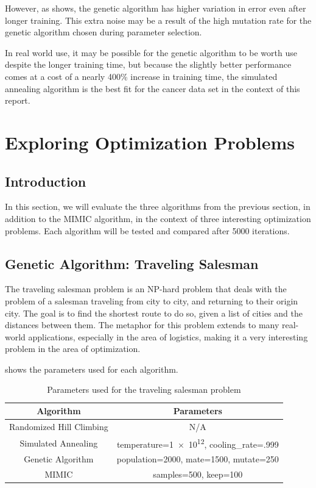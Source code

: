 \documentclass{article}
\begin{document}
      However, as  shows, the genetic algorithm has higher variation in error even after longer training. This extra noise may be a result of the high mutation rate for the genetic algorithm chosen during parameter selection.

      In real world use, it may be possible for the genetic algorithm to be worth use despite the longer training time, but because the slightly better performance comes at a cost of a nearly 400\% increase in training time, the simulated annealing algorithm is the best fit for the cancer data set in the context of this report.

  \section{Exploring Optimization Problems}

    \subsection{Introduction}
      In this section, we will evaluate the three algorithms from the previous section, in addition to the MIMIC algorithm, in the context of three interesting optimization problems. Each algorithm will be tested and compared after 5000 iterations.

    \subsection{Genetic Algorithm: Traveling Salesman}
      The traveling salesman problem is an NP-hard problem that deals with the problem of a salesman traveling from city to city, and returning to their origin city. The goal is to find the shortest route to do so, given a list of cities and the distances between them. The metaphor for this problem extends to many real-world applications, especially in the area of logistics, making it a very interesting problem in the area of optimization.

       shows the parameters used for each algorithm.

      \begin{table}[h!]
      \centering
        \begin{tabular}{||c|c||}\hline
          \textbf{Algorithm} & \textbf{Parameters} \\ \hline
          Randomized Hill Climbing & N/A \\ \hline
          Simulated Annealing & temperature=\num{1e12}, cooling\_rate=.999 \\ \hline
          Genetic Algorithm & population=2000, mate=1500, mutate=250 \\ \hline
          MIMIC & samples=500, keep=100 \\ \hline
        \end{tabular}

        \caption{Parameters used for the traveling salesman problem}
        \label{tab:ts-params}
      \end{table}
\end{document}
